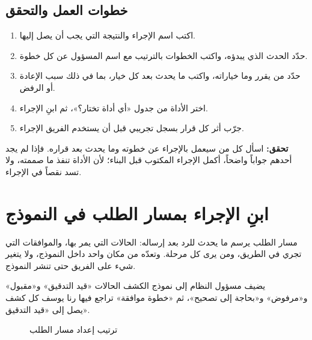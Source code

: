 \subsection{خطوات العمل والتحقق}
\begin{enumerate}
\item اكتب اسم الإجراء والنتيجة التي يجب أن يصل إليها.
\item حدّد الحدث الذي يبدؤه، واكتب الخطوات بالترتيب مع اسم المسؤول عن كل خطوة.
\item حدّد من يقرر وما خياراته، واكتب ما يحدث بعد كل خيار، بما في ذلك سبب الإعادة أو الرفض.
\item اختر الأداة من جدول «أي أداة تختار؟»، ثم ابنِ الإجراء.
\item جرّب أثر كل قرار بسجل تجريبي قبل أن يستخدم الفريق الإجراء.
\end{enumerate}

\textbf{تحقق:} اسأل كل من سيعمل بالإجراء عن خطوته وما يحدث بعد قراره. فإذا لم يجد أحدهم جواباً واضحاً، أكمل الإجراء المكتوب قبل البناء؛ لأن الأداة تنفذ ما صممته، ولا تسد نقصاً في الإجراء.

\section{ابنِ الإجراء بمسار الطلب في النموذج}
\label{sec:sops-journey}

مسار الطلب يرسم ما يحدث للرد بعد إرساله: الحالات التي يمر بها، والموافقات التي تجري في الطريق، ومن يرى كل مرحلة. وتعدّه من مكان واحد داخل النموذج، ولا يتغير شيء على الفريق حتى تنشر النموذج.

\begin{rcnote}
يضيف مسؤول النظام إلى نموذج الكشف الحالات «قيد التدقيق» و«مقبول» و«مرفوض» و«بحاجة إلى تصحيح»، ثم «خطوة موافقة» تراجع فيها رنا يوسف كل كشف يصل إلى «قيد التدقيق».
\end{rcnote}

\begin{figure}[H]
\centering
{}
\rclegend
\caption{ترتيب إعداد مسار الطلب}
\label{fig:sops-journey-order}
\end{figure}

